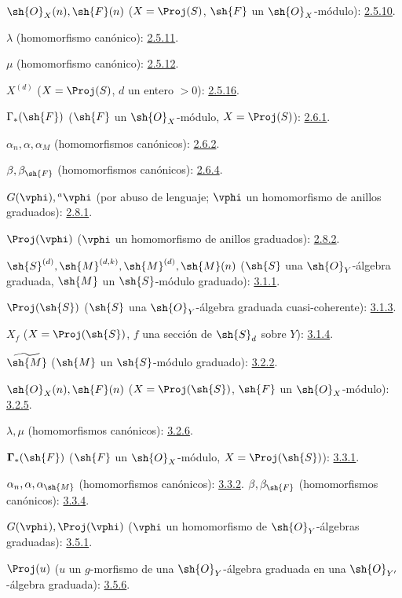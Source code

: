 \documentclass[oneside,10pt]{amsart}
\newcommand{\oldpage}[2][]{\marginnote{\normalfont\footnotesize\textbf{#1}~|~#2}\ignorespaces}
\begin{document}
$\sh{O}_X(n),\sh{F}(n)$
($X=\Proj(S)$, $\sh{F}$ un $\sh{O}_X$-módulo): \hyperref[II.2.5.10]{2.5.10}.

$\lambda$ (homomorfismo canónico): \hyperref[II.2.5.11]{2.5.11}.

$\mu$ (homomorfismo canónico): \hyperref[II.2.5.12]{2.5.12}.

$X^{(d)}$ ($X=\Proj(S)$, $d$ un entero $>0$): \hyperref[II.2.5.16]{2.5.16}.

$\Gamma_*(\sh{F})$ ($\sh{F}$ un $\sh{O}_X$-módulo,
$X=\Proj(S)$): \hyperref[II.2.6.1]{2.6.1}.

$\alpha_n,\alpha,\alpha_M$ (homomorfismos canónicos): \hyperref[II.2.6.2]{2.6.2}.

$\beta,\beta_{\sh{F}}$ (homomorfismos canónicos): \hyperref[II.2.6.4]{2.6.4}.

$G(\vphi),{}^a\vphi$ (por abuso de lenguaje;
$\vphi$ un homomorfismo de anillos graduados): \hyperref[II.2.8.1]{2.8.1}.

$\Proj(\vphi)$ ($\vphi$ un homomorfismo de anillos graduados): \hyperref[II.2.8.2]{2.8.2}.

$\sh{S}^{(d)},\sh{M}^{(d,k)},\sh{M}^{(d)},\sh{M}(n)$
($\sh{S}$ una $\sh{O}_Y$-álgebra graduada,
$\sh{M}$ un $\sh{S}$-módulo graduado): \hyperref[II.3.1.1]{3.1.1}.

$\Proj(\sh{S})$ ($\sh{S}$ una $\sh{O}_Y$-álgebra graduada cuasi-coherente): \hyperref[II.3.1.3]{3.1.3}.

$X_f$ ($X=\Proj(\sh{S})$, $f$ una sección de $\sh{S}_d$ sobre $Y$): \hyperref[II.3.1.4]{3.1.4}.

$\widetilde{\sh{M}}$ ($\sh{M}$ un $\sh{S}$-módulo graduado): \hyperref[II.3.2.2]{3.2.2}.

$\sh{O}_X(n),\sh{F}(n)$
($X=\Proj(\sh{S})$, $\sh{F}$ un $\sh{O}_X$-módulo): \hyperref[II.3.2.5]{3.2.5}.

$\lambda,\mu$ (homomorfismos canónicos): \hyperref[II.3.2.6]{3.2.6}.

$\boldsymbol{\Gamma}_*(\sh{F})$ ($\sh{F}$ un $\sh{O}_X$-módulo,
$X=\Proj(\sh{S})$): \hyperref[II.3.3.1]{3.3.1}.

$\alpha_n,\alpha,\alpha_{\sh{M}}$ (homomorfismos canónicos): \hyperref[II.3.3.2]{3.3.2}.
\oldpage[II]{208}
$\beta,\beta_{\sh{F}}$ (homomorfismos canónicos): \hyperref[II.3.3.4]{3.3.4}.

$G(\vphi),\Proj(\vphi)$
($\vphi$ un homomorfismo de $\sh{O}_Y$-álgebras graduadas): \hyperref[II.3.5.1]{3.5.1}.

$\Proj(u)$ ($u$ un $g$-morfismo de una $\sh{O}_Y$-álgebra graduada
en una $\sh{O}_{Y'}$-álgebra graduada): \hyperref[II.3.5.6]{3.5.6}.
\end{document}
